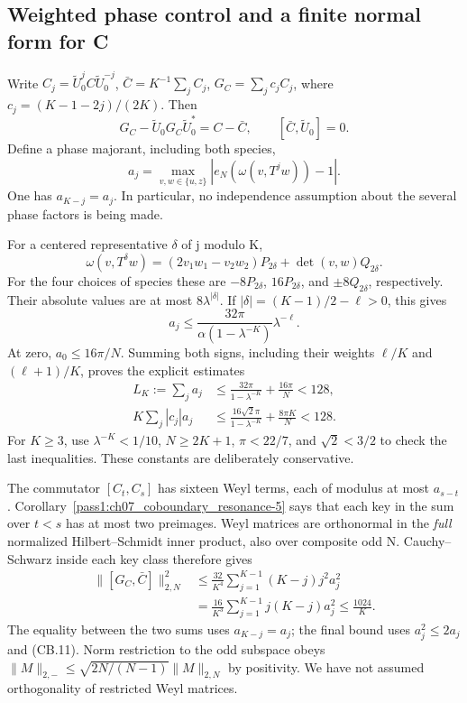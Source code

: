 \subsection{Weighted phase control and a finite normal form for C}\label{coboundary:weighted-phase-control-and-a-finite-normal-form-for-c}

Write \(C_j=\widetilde U_0^jC\widetilde U_0^{-j}\), \(\bar C=K^{-1}\sum_j C_j\), \(G_C=\sum_j c_jC_j\), where \(c_j=(K-1-2j)/(2K)\). Then \[
 G_C-\widetilde U_0G_C\widetilde U_0^*=C-\bar C,\qquad [\bar C,\widetilde U_0]=0.                \tag{CB.10}
\] Define a phase majorant, including both species, \[
 a_j=\max_{v,w\in\{u,z\}}
          |e_N(\omega(v,T^jw))-1|.
\] One has \(a_{K-j}=a_j\). In particular, no independence assumption about the several phase factors is being made.

For a centered representative \(\delta\) of j modulo K, \[
 \omega(v,T^\delta w)
 =(2v_1w_1-v_2w_2)P_{2\delta}+\det(v,w)Q_{2\delta}.
\] For the four choices of species these are \(-8P_{2\delta}\), \(16P_{2\delta}\), and \(\pm8Q_{2\delta}\), respectively. Their absolute values are at most \(8\lambda^{|\delta|}\). If \(|\delta|=(K-1)/2-\ell>0\), this gives \[
 a_j\leq\frac{32\pi}{\alpha(1-\lambda^{-K})}\lambda^{-\ell}.
\] At zero, \(a_0\leq16\pi/N\). Summing both signs, including their weights \(\ell/K\) and \((\ell+1)/K\), proves the explicit estimates \[
 \begin{split}
 L_K:=\sum_j a_j
   &\leq\frac{32\pi}{1-\lambda^{-K}}+\frac{16\pi}{N}<128,\\
 K\sum_j|c_j|a_j
   &\leq\frac{16\sqrt2\pi}{1-\lambda^{-K}}+
                                      \frac{8\pi K}{N}<128.
 \end{split}                                                    \tag{CB.11}
\] For \(K\geq3\), use \(\lambda^{-K}<1/10\), \(N\geq2K+1\), \(\pi<22/7\), and \(\sqrt2<3/2\) to check the last inequalities. These constants are deliberately conservative.

The commutator \([C_t,C_s]\) has sixteen Weyl terms, each of modulus at most \(a_{s-t}\). Corollary~\ref{pass1:ch07_coboundary_resonance-5} says that each key in the sum over \(t<s\) has at most two preimages. Weyl matrices are orthonormal in the \emph{full} normalized Hilbert--Schmidt inner product, also over composite odd N. Cauchy--Schwarz inside each key class therefore gives \[
 \begin{split}
 \|[G_C,\bar C]\|_{2,N}^2
 &\leq\frac{32}{K^4}\sum_{j=1}^{K-1}(K-j)j^2a_j^2\\
 &=\frac{16}{K^3}\sum_{j=1}^{K-1}j(K-j)a_j^2
 \leq\frac{1024}{K}.
 \end{split}                                                    \tag{CB.12}
\] The equality between the two sums uses \(a_{K-j}=a_j\); the final bound uses \(a_j^2\leq2a_j\) and (CB.11). Norm restriction to the odd subspace obeys \(\|M\|_{2,-}\leq\sqrt{2N/(N-1)}\|M\|_{2,N}\) by positivity. We have not assumed orthogonality of restricted Weyl matrices.

